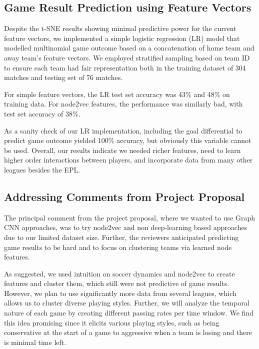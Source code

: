 \subsection{Game Result Prediction using Feature Vectors}
Despite the t-SNE results showing minimal predictive power for the current feature vectors, we implemented a simple logistic regression (LR) model that modelled multinomial game outcome based on a concatenation of home team and away team's feature vectors. We employed stratified sampling based on team ID to ensure each team had fair representation both in the training dataset of 304 matches and testing set of 76 matches. 

For simple feature vectors, the LR test set accuracy was 43\% and 48\% on training data. For node2vec features, the performance was similarly bad, with test set accuracy of 38\%. 

As a sanity check of our LR implementation, including the goal differential to predict game outcome yielded 100\% accuracy, but obviously this variable cannot be used. Overall, our results indicate we needed richer features, need to learn higher order interactions between players, and incorporate data from many other leagues besides the EPL.

\subsection{Addressing Comments from Project Proposal}
The principal comment from the project proposal, where we wanted to use Graph CNN approaches, was to try node2vec and non deep-learning based approaches due to our limited dataset size. Further, the reviewers anticipated predicting game results to be hard and to focus on clustering teams via learned node features. 

As suggested, we used intuition on soccer dynamics and node2vec to create features and cluster them, which still were not predictive of game results. However, we plan to use significantly more data from several leagues, which allows us to cluster diverse playing styles. Further, we will analyze the temporal nature of each game by creating different passing rates per time window. We find this idea promising since it elicits various playing styles, such as being conservative at the start of a game to aggressive when a team is losing and there is minimal time left.




